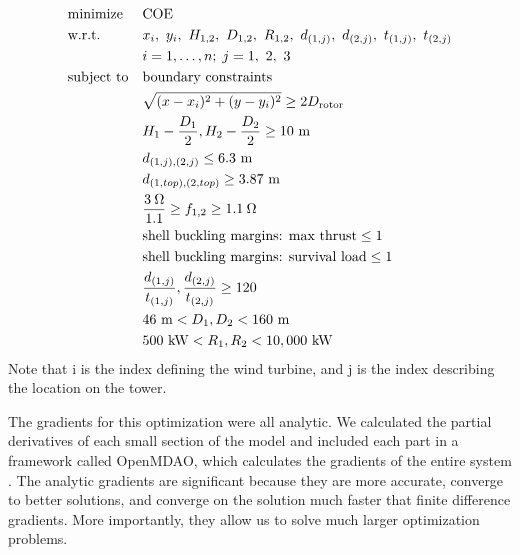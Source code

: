 \documentclass[wes, manuscript]{copernicus}
\begin{document}
        
        \begin{equation}
			\begin{aligned}
				& \text{minimize}
					& & \text{COE} \\
                & \text{w.r.t.} 
                	&& x_i,~ y_i,~ H_{1,2},~ D_{1,2},~ R_{1,2},~ d_{(1,j)},~ d_{(2,j)},~ t_{(1,j)},~t_{(2,j)}\\
                		&&& i = 1, \ldots, n; \; j = 1,~2,~3 \\
				& \text{subject to}
					& & \text{boundary constraints} \\
						&&& \sqrt{(x-x_i)^2+(y-y_i)^2} \geq 2D_{\text{rotor}} \\
						&&& H_1-\frac{D_1}{2}, H_2-\frac{D_2}{2} \geq 10~ \text{m}\\
                		&&& d_{(1,j),(2,j)} \leq 6.3~ \text{m}\\
                		&&& d_{(1,top),(2,top)} \geq 3.87~ \text{m}\\
						&&& \frac{3\hspace{0.08cm}\Omega}{1.1} \geq f_{1,2} \geq 1.1\hspace{0.08cm}\Omega \\
                		&&& \text{shell buckling margins: max thrust} \leq 1 \\
                        &&& \text{shell buckling margins: survival load} \leq 1 \\
                		&&& \frac{d_{(1,j)}}{t_{(1,j)}},\frac{d_{(2,j)}}{t_{(2,j)}} \geq 120\\
                        &&& 46~ \text{m} < D_1,D_2 < 160~ \text{m}  \\
                        &&& 500~ \text{kW} < R_1,R_2 < 10,000~ \text{kW} \\
			\end{aligned}
		\end{equation}
%
Note that i is the index defining the wind turbine, and j is the index describing the location on the tower.
        
        The gradients for this optimization were all analytic. We calculated the partial derivatives of each small section of the model and included each part in a framework called OpenMDAO, which calculates the gradients of the entire system \citep{gray2010openmdao}. The analytic gradients are significant because they are more accurate, converge to better solutions, and converge on the solution much faster that finite difference gradients. More importantly, they allow us to solve much larger optimization problems. %
        
\end{document}
